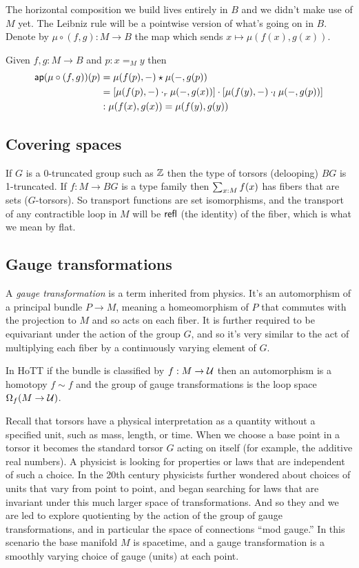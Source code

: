The horizontal composition we build lives entirely in \(B\) and we
didn't make use of \(M\) yet. The Leibniz rule will be a pointwise
version of what's going on in \(B\). Denote by \(\mu\circ(f,g):M\to B\)
the map which sends \(x\mapsto \mu(f(x),g(x))\).

\begin{mylemma}
Given \( f, g:M\to B \) and \( p:x=_M y \) then 
\begin{align*}
 \mathsf{ap}(\mu\circ(f,g))(p)&=\mu(f(p),-)\star\mu(-,g(p))\\
 &=\left[\mu(f(p),-)\cdot_r \mu(-,g(x))\right]\cdot \left[\mu(f(y),-)\cdot_l\mu(-,g(p))\right]\\
 &:\mu(f(x),g(x))=\mu(f(y),g(y))
\end{align*}
\end{mylemma}

\subsection{Covering spaces}\label{covering-spaces}

If \(G\) is a 0-truncated group such as \(\mathbb{Z}\) then the type of torsors
(delooping) \(BG\) is 1-truncated. If \(f:M\to BG\) is a type family
then \(\sum_{x:M}f(x)\) has fibers that are sets (\(G\)-torsors). So
transport functions are set isomorphisms, and the transport of any
contractible loop in \(M\) will be \(\mathsf{refl}\) (the identity) of the
fiber, which is what we mean by flat.

\subsection{Gauge transformations}\label{gauge-transformations}

A \emph{gauge transformation} is a term inherited from physics. It's an
automorphism of a principal bundle \(P\to M\), meaning a homeomorphism
of \(P\) that commutes with the projection to \(M\) and so acts on each
fiber. It is further required to be equivariant under the action of the
group \(G\), and so it's very similar to the act of multiplying each
fiber by a continuously varying element of \(G\).

In HoTT if the bundle is classified by \(f:M\to \mathcal{U}\) then an
automorphism is a homotopy \(f\sim f\) and the group of gauge
transformations is the loop space \(\Omega_f(M\to \mathcal{U})\).

Recall that torsors have a physical interpretation as a quantity without
a specified unit, such as mass, length, or time. When we choose a base
point in a torsor it becomes the standard torsor \(G\) acting on itself
(for example, the additive real numbers). A physicist is looking for
properties or laws that are independent of such a choice. In the 20th
century physicists further wondered about choices of units that vary
from point to point, and began searching for laws that are invariant
under this much larger space of transformations. And so they and we are
led to explore quotienting by the action of the group of gauge
transformations, and in particular the space of connections ``mod
gauge.'' In this scenario the base manifold \(M\) is spacetime, and a
gauge transformation is a smoothly varying choice of gauge (units) at
each point.

